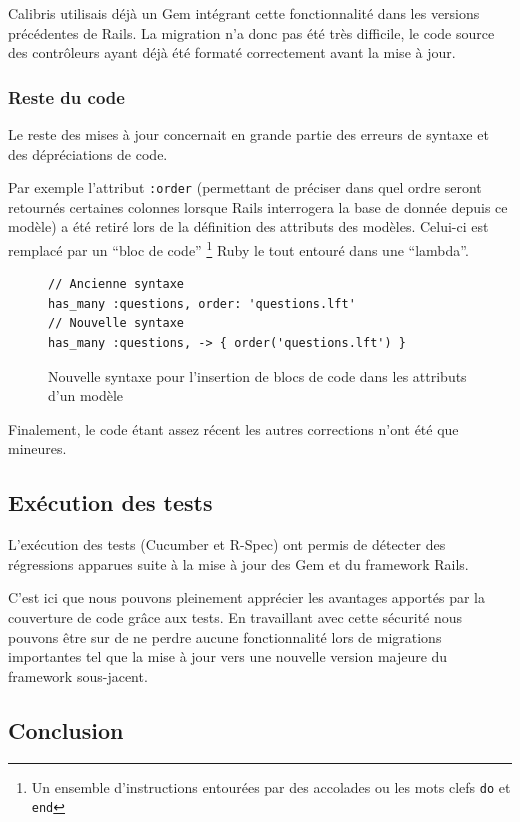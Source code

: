 \documentclass[12pt,a4paper]{book}
\begin{document}
Calibris utilisais déjà un Gem intégrant cette fonctionnalité dans les versions précédentes de Rails. La migration n'a donc pas été très difficile, le code source des contrôleurs ayant déjà été formaté correctement avant la mise à jour.
    
\subsubsection{Reste du code}

Le reste des mises à jour concernait en grande partie des erreurs de syntaxe et des dépréciations de code.

Par exemple l'attribut \texttt{:order} (permettant de préciser dans quel ordre seront retournés certaines colonnes lorsque Rails interrogera la base de donnée depuis ce modèle) a été retiré lors de la définition des attributs des modèles. Celui-ci est remplacé par un ``bloc de code'' \footnote{Un ensemble d'instructions entourées par des accolades ou les mots clefs \texttt{do} et \texttt{end}} Ruby le tout entouré dans une ``lambda''.

    \begin{figure}[h]
    \lstset{language=ruby}
    \begin{lstlisting}
// Ancienne syntaxe
has_many :questions, order: 'questions.lft'
// Nouvelle syntaxe
has_many :questions, -> { order('questions.lft') }
    \end{lstlisting}
     \caption{Nouvelle syntaxe pour l'insertion de blocs de code dans les attributs d'un modèle}
    \end{figure}
    
Finalement, le code étant assez récent les autres corrections n'ont été que mineures.

\subsection{Exécution des tests}

L'exécution des tests (Cucumber et R-Spec) ont permis de détecter des régressions apparues suite à la mise à jour des Gem et du framework Rails.

C'est ici que nous pouvons pleinement apprécier les avantages apportés par la couverture de code grâce aux tests. En travaillant avec cette sécurité nous pouvons être sur de ne perdre aucune fonctionnalité lors de migrations importantes tel que la mise à jour vers une nouvelle version majeure du framework sous-jacent.

\subsection*{Conclusion}
\end{document}

